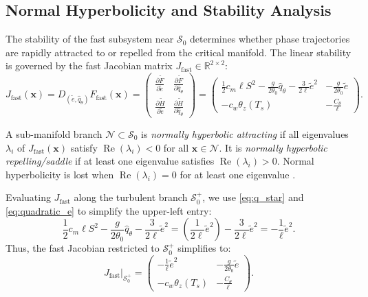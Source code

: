 \subsection{Normal Hyperbolicity and Stability Analysis}

The stability of the fast subsystem near $\mathcal{S}_0$ determines whether phase trajectories are rapidly attracted to or repelled from the critical manifold. The linear stability is governed by the fast Jacobian matrix $J_{\mathrm{fast}} \in \mathbb{R}^{2 \times 2}$:
\begin{equation}
J_{\mathrm{fast}}(\mathbf{x}) = D_{(\tilde e, \hat q_\theta)} F_{\mathrm{fast}}(\mathbf{x}) =
\begin{pmatrix}
\frac{\partial \tilde F}{\partial \tilde e} & \frac{\partial \tilde F}{\partial \hat q_\theta} \\[6pt]
\frac{\partial \tilde H}{\partial \tilde e} & \frac{\partial \tilde H}{\partial \hat q_\theta}
\end{pmatrix}
=
\begin{pmatrix}
\frac{1}{2} c_m \ell S^2 - \frac{g}{2\theta_0} \hat q_\theta - \frac{3}{2\ell} \tilde e^2 & -\frac{g}{2\theta_0} \tilde e \\[6pt]
-c_w \theta_z(T_s) & -\frac{C_\theta}{\ell}
\end{pmatrix}.
\end{equation}

\begin{definition}
A sub-manifold branch $\mathcal{N} \subset \mathcal{S}_0$ is \emph{normally hyperbolic attracting} if all eigenvalues $\lambda_i$ of $J_{\mathrm{fast}}(\mathbf{x})$ satisfy $\operatorname{Re}(\lambda_i) < 0$ for all $\mathbf{x} \in \mathcal{N}$. It is \emph{normally hyperbolic repelling/saddle} if at least one eigenvalue satisfies $\operatorname{Re}(\lambda_i) > 0$. Normal hyperbolicity is lost when $\operatorname{Re}(\lambda_i) = 0$ for at least one eigenvalue \citep{Fenichel1979}.
\end{definition}

Evaluating $J_{\mathrm{fast}}$ along the turbulent branch $\mathcal{S}_0^+$, we use \eqref{eq:q_star} and \eqref{eq:quadratic_e} to simplify the upper-left entry:
\begin{equation}
\frac{1}{2} c_m \ell S^2 - \frac{g}{2\theta_0} \hat q_\theta - \frac{3}{2\ell} \tilde e^2 = \left( \frac{1}{2\ell} \tilde e^2 \right) - \frac{3}{2\ell} \tilde e^2 = -\frac{1}{\ell} \tilde e^2.
\end{equation}
Thus, the fast Jacobian restricted to $\mathcal{S}_0^+$ simplifies to:
\begin{equation}
\left. J_{\mathrm{fast}} \right|_{\mathcal{S}_0^+} =
\begin{pmatrix}
-\frac{1}{\ell} \tilde e^2 & -\frac{g}{2\theta_0} \tilde e \\[6pt]
-c_w \theta_z(T_s) & -\frac{C_\theta}{\ell}
\end{pmatrix}.
\label{eq:J_restricted}
\end{equation}

